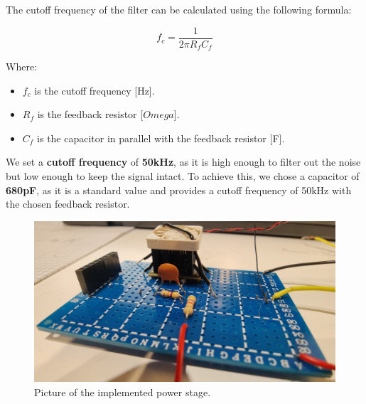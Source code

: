 \begin{samepage}
    The cutoff frequency of the filter can be calculated using the following formula:
    \nopagebreak

    \begin{equation*}
        f_c = \frac{1}{2\pi R_f C_f}
    \end{equation*}
    \nopagebreak

    Where:
    \nopagebreak
    \begin{itemize}
        \item $f_c$ is the cutoff frequency [Hz].
        \item $R_f$ is the feedback resistor [$Omega$].
        \item $C_f$ is the capacitor in parallel with the feedback resistor [F].
    \end{itemize}
\end{samepage}


We set a \textbf{cutoff frequency} of \textbf{50kHz}, as it is high enough to filter out the noise but low enough to keep the signal intact.
To achieve this, we chose a capacitor of \textbf{680pF}, as it is a standard value and provides a cutoff frequency of 50kHz with the chosen feedback resistor.

\begin{figure}[H]
    \centering
    \includegraphics[width = 0.6\linewidth]{Chapters/Chapter4/Figures/irl_power_stage.jpg}
    \caption{Picture of the implemented power stage.}
    \label{fig:IRL_power_stage}
\end{figure}

